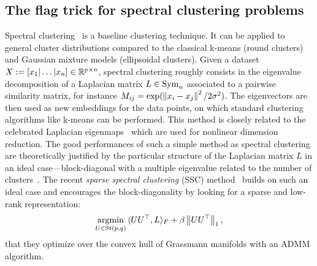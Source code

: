 \subsection{The flag trick for spectral clustering problems}
Spectral clustering~\citep{ng_spectral_2001} is a baseline clustering technique. It can be applied to general cluster distributions compared to the classical k-means (round clusters) and Gaussian mixture models (ellipsoidal clusters).
Given a dataset $X := [x_1|\dots|x_n] \in \mathbb{R}^{p\times n}$, spectral clustering roughly consists in the eigenvalue decomposition of a Laplacian matrix $L\in\operatorname{Sym}_n$ associated to a pairwise similarity matrix, for instance $M_{ij} = \exp(\left\lVert x_i - x_j\right\rVert^2 / 2\sigma^2)$. The eigenvectors are then used as new embeddings for the data points, on which standard clustering algorithms like k-means can be performed. This method is closely related to the celebrated Laplacian eigenmaps~\citep{belkin_laplacian_2003} which are used for nonlinear dimension reduction.
The good performances of such a simple method as spectral clustering are theoretically justified by the particular structure of the Laplacian matrix $L$ in an ideal case---block-diagonal with a multiple eigenvalue related to the number of clusters~\citep{ng_spectral_2001}.
The recent \textit{sparse spectral clustering} (SSC) method~\citep{lu_convex_2016} builds on such an ideal case and encourages the block-diagonality by looking for a sparse and low-rank representation:
\begin{equation}\label{eq:SSC_lu}
	\underset{U \in \operatorname{St}(p, q)}{\operatorname{argmin}} \, \langle U U^\top, L\rangle_F + \beta \left\lVert U U^\top \right\rVert_1,
\end{equation}
that they optimize over the convex hull of Grassmann manifolds with an ADMM algorithm.

